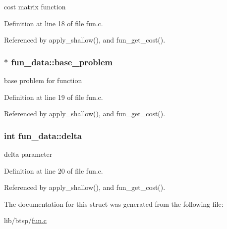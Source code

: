 cost matrix function 

Definition at line 18 of file fun.c.

Referenced by apply\_\-shallow(), and fun\_\-get\_\-cost().\hypertarget{structfun__data_8975a7eed7c3a3fa00f7a15c54e1c80b}{
\subsubsection{$\ast$ {\bf fun\_\-data::base\_\-problem}}}
\label{structfun__data_8975a7eed7c3a3fa00f7a15c54e1c80b}


base problem for function 

Definition at line 19 of file fun.c.

Referenced by apply\_\-shallow(), and fun\_\-get\_\-cost().\hypertarget{structfun__data_1d0479ab1ce43aa65ba7cac44874d414}{
\subsubsection{\setlength{\rightskip}{0pt plus 5cm}int {\bf fun\_\-data::delta}}}
\label{structfun__data_1d0479ab1ce43aa65ba7cac44874d414}


delta parameter 

Definition at line 20 of file fun.c.

Referenced by apply\_\-shallow(), and fun\_\-get\_\-cost().

The documentation for this struct was generated from the following file:\begin{CompactItemize}
\item 
lib/btsp/\hyperlink{fun_8c}{fun.c}\end{CompactItemize}

